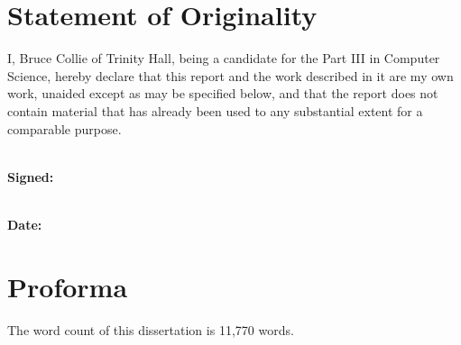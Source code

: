 \section*{Statement of Originality}

I, Bruce Collie of Trinity Hall, being a candidate for the Part III in Computer
Science, hereby declare that this report and the work described in it are my own
work, unaided except as may be specified below, and that the report does not
contain material that has already been used to any substantial extent for a
comparable purpose.

\vspace{0.5cm}

\noindent
\\\textbf{Signed:}

\vspace{0.5cm}

\noindent
\\\textbf{Date:}

\section*{Proforma}

The word count of this dissertation is 11,770 words.
